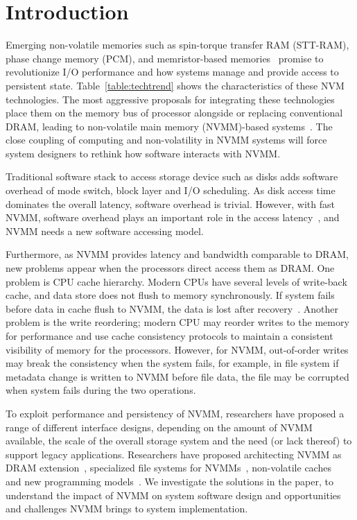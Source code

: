 \section{Introduction}
\label{sec:introduction}

Emerging non-volatile memories such as spin-torque transfer RAM (STT-RAM),
phase change memory (PCM), and
memristor-based memories~\cite{moneta, monetad, quicksan,Onyx,
pollisbetterthaninterrupt}
promise to revolutionize I/O performance and how
systems manage and provide access to persistent state.
Table~\ref{table:techtrend}
shows the characteristics of these NVM technologies. The most aggressive
proposals for integrating these technologies place them on the memory bus
of processor alongside or replacing conventional DRAM, 
leading to non-volatile
main memory (NVMM)-based systems~\cite{PCM_EfficientMainMemory,
PCMHierarchy,eNVy,WSP,LeeISCA09}. The close coupling of computing and
non-volatility in NVMM systems will force system designers to rethink how
software interacts with NVMM.

Traditional software stack to access storage device such as disks
adds software overhead of mode switch, block layer and I/O scheduling.
As disk access time dominates the overall latency, software overhead is trivial.
However, with fast NVMM, software overhead plays an important role
in the access latency~\cite{monetad,BankShot}, and NVMM needs a new
software accessing model.

Furthermore, as NVMM provides latency and bandwidth comparable to DRAM,
new problems
appear when the processors direct access them as DRAM. One problem is 
CPU cache hierarchy. Modern CPUs have several levels of write-back cache,
 and data store does not flush to memory synchronously. If system fails before
data in cache flush to NVMM, the data is lost after
recovery~\cite{CPUcaching}. Another
problem is the write reordering; modern CPU may reorder writes to the
memory for performance and use cache consistency protocols to maintain
a consistent visibility of memory for the processors. However, for NVMM,
out-of-order writes may break the consistency when the system fails,
for example, in file system if metadata change is written to NVMM before
file data, the file may be corrupted when system fails during the two 
operations. 

To exploit performance and persistency of NVMM,
researchers have proposed a range of different interface designs,
depending on the amount of
NVMM available, the scale of the overall storage system and the need (or lack
thereof) to support legacy applications.  Researchers have proposed architecting
NVMM as DRAM extension~\cite{pdram, memorage, duet}, specialized
file systems for NVMMs~\cite{PMFS,BPFS}, non-volatile
caches~\cite{RVM,riofilecache,riovista} and new programming
models~\cite{nvheaps,mnemosyne}. We investigate the solutions in the paper, to
understand the impact of NVMM on system software design and opportunities
and challenges NVMM brings to system implementation.

